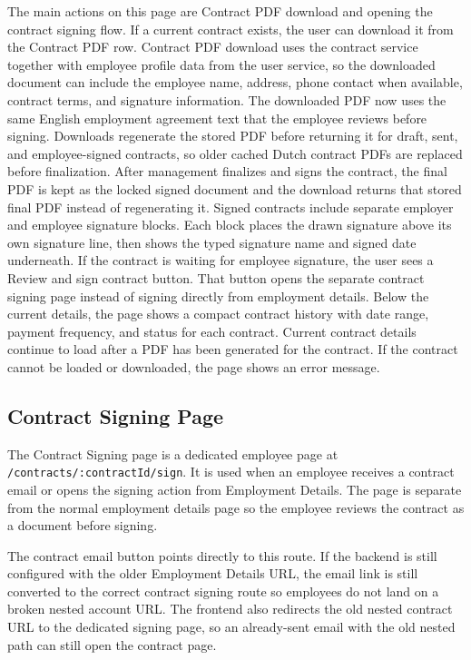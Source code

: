 \documentclass[11pt]{article}
\newcommand{\code}[1]{\nolinkurl{#1}}
\begin{document}
The main actions on this page are Contract PDF download and opening the contract signing flow. If a current contract exists, the user can download it from the Contract PDF row. Contract PDF download uses the contract service together with employee profile data from the user service, so the downloaded document can include the employee name, address, phone contact when available, contract terms, and signature information. The downloaded PDF now uses the same English employment agreement text that the employee reviews before signing. Downloads regenerate the stored PDF before returning it for draft, sent, and employee-signed contracts, so older cached Dutch contract PDFs are replaced before finalization. After management finalizes and signs the contract, the final PDF is kept as the locked signed document and the download returns that stored final PDF instead of regenerating it. Signed contracts include separate employer and employee signature blocks. Each block places the drawn signature above its own signature line, then shows the typed signature name and signed date underneath. If the contract is waiting for employee signature, the user sees a Review and sign contract button. That button opens the separate contract signing page instead of signing directly from employment details. Below the current details, the page shows a compact contract history with date range, payment frequency, and status for each contract. Current contract details continue to load after a PDF has been generated for the contract. If the contract cannot be loaded or downloaded, the page shows an error message.

\subsection{Contract Signing Page}

The Contract Signing page is a dedicated employee page at \code{/contracts/:contractId/sign}. It is used when an employee receives a contract email or opens the signing action from Employment Details. The page is separate from the normal employment details page so the employee reviews the contract as a document before signing.

The contract email button points directly to this route. If the backend is still configured with the older Employment Details URL, the email link is still converted to the correct contract signing route so employees do not land on a broken nested account URL. The frontend also redirects the old nested contract URL to the dedicated signing page, so an already-sent email with the old nested path can still open the contract page.
\end{document}
